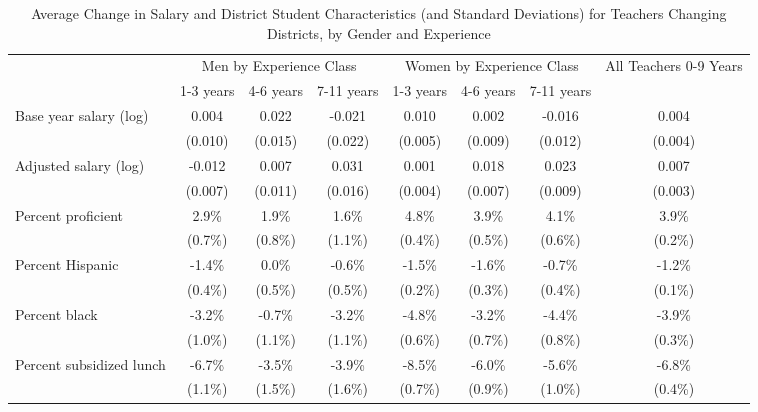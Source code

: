 \documentclass[]{article}
\begin{document}
\begin{sidewaystable}[ht]
\centering
\begin{tabular}{lccccccc}
  \hline
 & \multicolumn{3}{c}{Men by Experience Class} & \multicolumn{3}{c}{Women by Experience Class} & \multirow{2}{*}{\parbox{0.09\linewidth}{All Teachers 0-9 Years}}\\ \cline{2-4} \cline{5-7}
 & 1-3 years & 4-6 years & 7-11 years & 1-3 years & 4-6 years & 7-11 years &  \\ 
  \hline
Base year salary (log) & 0.004 & 0.022 & -0.021 & 0.010 & 0.002 & -0.016 & 0.004 \\ 
   & (0.010) & (0.015) & (0.022) & (0.005) & (0.009) & (0.012) & (0.004) \\ 
  Adjusted salary (log) & -0.012 & 0.007 & 0.031 & 0.001 & 0.018 & 0.023 & 0.007 \\ 
   & (0.007) & (0.011) & (0.016) & (0.004) & (0.007) & (0.009) & (0.003) \\ 
  Percent proficient & 2.9\% & 1.9\% & 1.6\% & 4.8\% & 3.9\% & 4.1\% & 3.9\% \\ 
   & (0.7\%) & (0.8\%) & (1.1\%) & (0.4\%) & (0.5\%) & (0.6\%) & (0.2\%) \\ 
  Percent Hispanic & -1.4\% & 0.0\% & -0.6\% & -1.5\% & -1.6\% & -0.7\% & -1.2\% \\ 
   & (0.4\%) & (0.5\%) & (0.5\%) & (0.2\%) & (0.3\%) & (0.4\%) & (0.1\%) \\ 
  Percent black & -3.2\% & -0.7\% & -3.2\% & -4.8\% & -3.2\% & -4.4\% & -3.9\% \\ 
   & (1.0\%) & (1.1\%) & (1.1\%) & (0.6\%) & (0.7\%) & (0.8\%) & (0.3\%) \\ 
  Percent subsidized lunch & -6.7\% & -3.5\% & -3.9\% & -8.5\% & -6.0\% & -5.6\% & -6.8\% \\ 
   & (1.1\%) & (1.5\%) & (1.6\%) & (0.7\%) & (0.9\%) & (1.0\%) & (0.4\%) \\ 
   \hline
\end{tabular}
\caption{Average Change in Salary and District Student Characteristics (and Standard Deviations) for Teachers Changing Districts, by Gender and Experience} 
\label{tbl:change_by_ge}
\end{sidewaystable}
\end{document}

